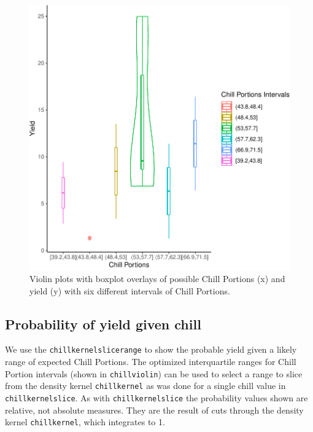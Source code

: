 \documentclass[]{article}
\begin{document}
\begin{figure}
\centering
\includegraphics{Abstract_SHE_Chill_Yield_Model_files/figure-latex/unnamed-chunk-5-1.pdf}
\caption{Violin plots with boxplot overlays of possible Chill Portions
(x) and yield (y) with six different intervals of Chill Portions.}
\end{figure}

\hypertarget{probability-of-yield-given-chill}{%
\subsection{Probability of yield given
chill}\label{probability-of-yield-given-chill}}

We use the \texttt{chillkernelslicerange} to show the probable yield
given a likely range of expected Chill Portions. The optimized
interquartile ranges for Chill Portion intervals (shown in
\texttt{chillviolin}) can be used to select a range to slice from the
density kernel \texttt{chillkernel} as was done for a single chill value
in \texttt{chillkernelslice}. As with \texttt{chillkernelslice} the
probability values shown are relative, not absolute measures. They are
the result of cuts through the density kernel \texttt{chillkernel},
which integrates to 1.
\end{document}
